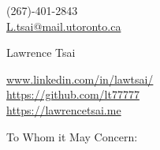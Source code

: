 \documentclass[11pt,a4]{article}
\begin{document}
\begin{center}
    \begin{minipage}[b]{0.24\textwidth}
            \large (267)-401-2843 \\
            \large \href{mailto:L.tsai@mail.utoronto.ca}{L.tsai@mail.utoronto.ca} 
    \end{minipage}%
    \begin{minipage}[b]{0.5\textwidth}
            \centering
            {\Huge Lawrence Tsai} \\ %
            \vspace{0.1cm}
            {\color{UI_blue} \Large{}}
    \end{minipage}%
    \begin{minipage}[b]{0.33\textwidth}
            \flushright \large
            {\href{www.linkedin.com/in/lawtsai/}{www.linkedin.com/in/lawtsai/} } \\
            \href{https://github.com/lt77777}{https://github.com/lt77777} \\
            \href{https://lawrencetsai.me}
            {https://lawrencetsai.me}
    \end{minipage}   
    
\vspace{-0.15cm} 
{\color{UI_blue} \hrulefill}
\end{center}

\justify
\setlength{\parindent}{0pt}
\setlength{\parskip}{12pt}
\vspace{0.2cm}




To Whom it May Concern:
\end{document}
